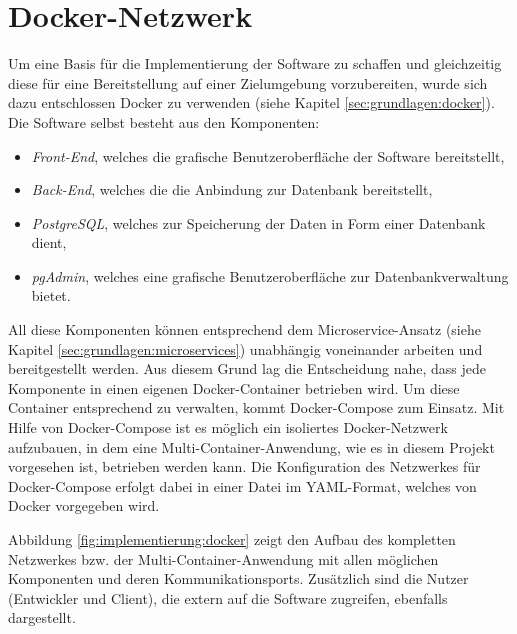\section{Docker-Netzwerk}

Um eine Basis für die Implementierung der Software zu schaffen und gleichzeitig diese für eine Bereitstellung auf einer Zielumgebung vorzubereiten, wurde sich dazu entschlossen Docker zu verwenden (siehe Kapitel \ref{sec:grundlagen:docker}). 
Die Software selbst besteht aus den Komponenten:
\begin{itemize}
	\item \emph{Front-End}, welches die grafische Benutzeroberfläche der Software bereitstellt,
	\item \emph{Back-End}, welches die die Anbindung zur Datenbank bereitstellt,
	\item \emph{PostgreSQL}, welches zur Speicherung der Daten in Form einer Datenbank dient,
	\item \emph{pgAdmin}, welches eine grafische Benutzeroberfläche zur Datenbankverwaltung bietet.
\end{itemize}

All diese Komponenten können entsprechend dem Microservice-Ansatz (siehe Kapitel \ref{sec:grundlagen:microservices}) unabhängig voneinander arbeiten und bereitgestellt werden. 
Aus diesem Grund lag die Entscheidung nahe, dass jede Komponente in einen eigenen Docker-Container betrieben wird.
Um diese Container entsprechend zu verwalten, kommt Docker-Compose zum Einsatz.
Mit Hilfe von Docker-Compose ist es möglich ein isoliertes Docker-Netzwerk aufzubauen, in dem eine Multi-Container-Anwendung, wie es in diesem Projekt vorgesehen ist, betrieben werden kann.
Die Konfiguration des Netzwerkes für Docker-Compose erfolgt dabei in einer Datei im YAML-Format, welches von Docker vorgegeben wird.

Abbildung \ref{fig:implementierung:docker} zeigt den Aufbau des kompletten Netzwerkes bzw. der Multi-Container-Anwendung mit allen möglichen Komponenten und deren Kommunikationsports. 
Zusätzlich sind die Nutzer (Entwickler und Client), die extern auf die Software zugreifen, ebenfalls dargestellt.


